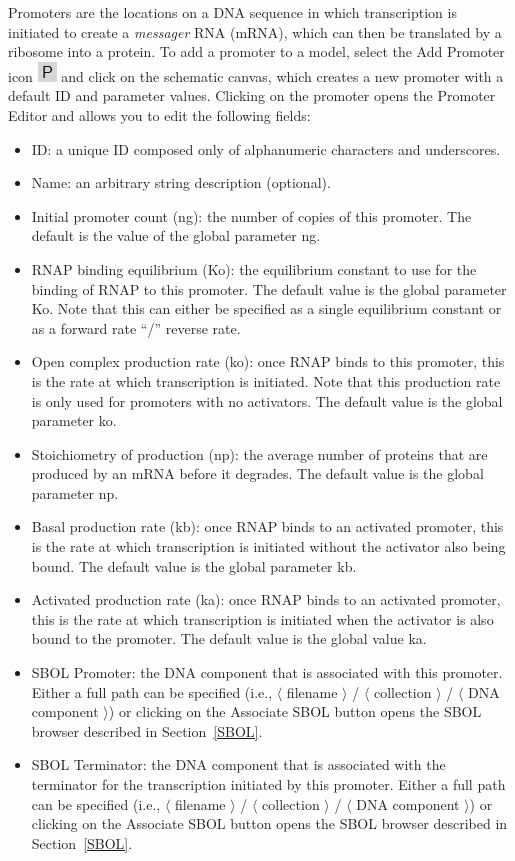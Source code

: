 \documentclass[titlepage,11pt]{article}
\begin{document}
\noindent
Promoters are the locations on a DNA sequence in which transcription is initiated to create a \emph{messager} RNA (mRNA), which can then be translated by a ribosome into a protein.  To add a promoter to a model, select the Add Promoter icon \includegraphics{../gui/icons/modelview/promoter_mode_selected} and click on the schematic canvas, which creates a new promoter with a default ID and parameter values.  Clicking on the promoter opens the Promoter Editor and allows you to edit the following fields:
\begin{itemize}
\item ID: a unique ID composed only of alphanumeric characters and underscores.
\item Name: an arbitrary string description (optional).
\item Initial promoter count (ng): the number of copies of this promoter.  The default is the value of the global parameter ng.   
\item RNAP binding equilibrium (Ko): the equilibrium constant to use for the binding of RNAP to this promoter.  The default value is the global parameter Ko.  Note that this can either be specified as a single equilibrium constant or as a forward rate ``/'' reverse rate.
\item Open complex production rate (ko): once RNAP binds to this promoter, this is the rate at which transcription is initiated.  Note that this production rate is only used for promoters with no activators.  The default value is the global parameter ko.
\item Stoichiometry of production (np): the average number of proteins that are produced by an mRNA before it degrades.  The default value is the global parameter np.
\item Basal production rate (kb): once RNAP binds to an activated promoter, this is the rate at which transcription is initiated without the activator also being bound.  The default value is the global parameter kb.
\item Activated production rate (ka): once RNAP binds to an activated promoter, this is the rate at which transcription is initiated when the activator is also bound to the promoter.  The default value is the global value ka.
\item SBOL Promoter: the DNA component that is associated with this promoter.     Either a full path can be specified (i.e., $\langle$ filename $\rangle$ / $\langle$ collection $\rangle$ / $\langle$ DNA component $\rangle$) or clicking on the Associate SBOL button opens the SBOL browser described in Section~\ref{SBOL}.
\item SBOL Terminator: the DNA component that is associated with the terminator for the transcription initiated by this promoter.     Either a full path can be specified (i.e., $\langle$ filename $\rangle$ / $\langle$ collection $\rangle$ / $\langle$ DNA component $\rangle$) or clicking on the Associate SBOL button opens the SBOL browser described in Section~\ref{SBOL}.
\end{itemize}
\end{document}
